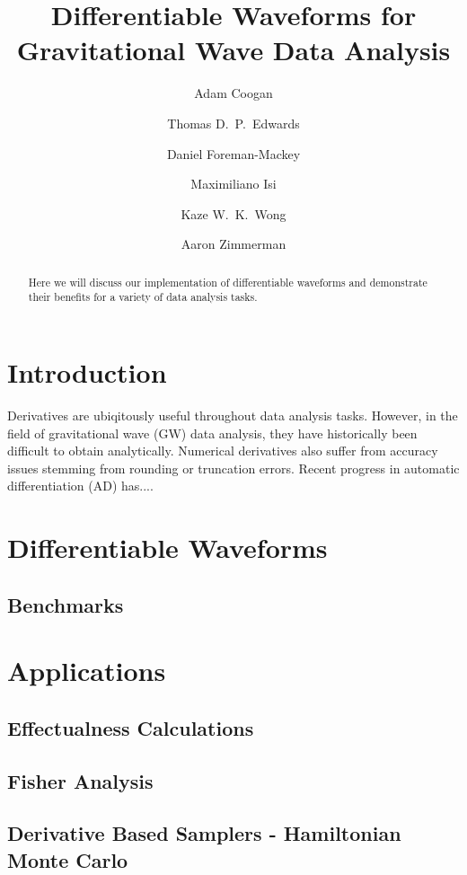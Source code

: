\documentclass[twocolumn]{aastex631}
\begin{document}
\title{Differentiable Waveforms for Gravitational Wave Data Analysis}

\author{Adam Coogan}
\author{Thomas D.~P.~Edwards}
\author{Daniel Foreman-Mackey}
\author{Maximiliano Isi}
\author{Kaze W.~K.~Wong}
\author{Aaron Zimmerman}

\begin{abstract}
    Here we will discuss our implementation of differentiable waveforms and demonstrate their benefits for a variety of data analysis tasks.
\end{abstract}

\section{Introduction}
\label{sec:intro}

Derivatives are ubiqitously useful throughout data analysis tasks.
However, in the field of gravitational wave (GW) data analysis, they have historically been difficult to obtain analytically.
Numerical derivatives also suffer from accuracy issues stemming from rounding or truncation errors.
Recent progress in automatic differentiation (AD) has.... \citep{Coogan:2022qxs}

\section{Differentiable Waveforms}
\label{sec:waveforms}

\subsection{Benchmarks}
\label{subsec:benchmarks}

\section{Applications}
\label{sec:applications}

\subsection{Effectualness Calculations}
\label{sec:effectualness}

\subsection{Fisher Analysis}
\label{subsec:fisher}

\subsection{Derivative Based Samplers - Hamiltonian Monte Carlo}
\label{subsec:hmc}



\end{document}
